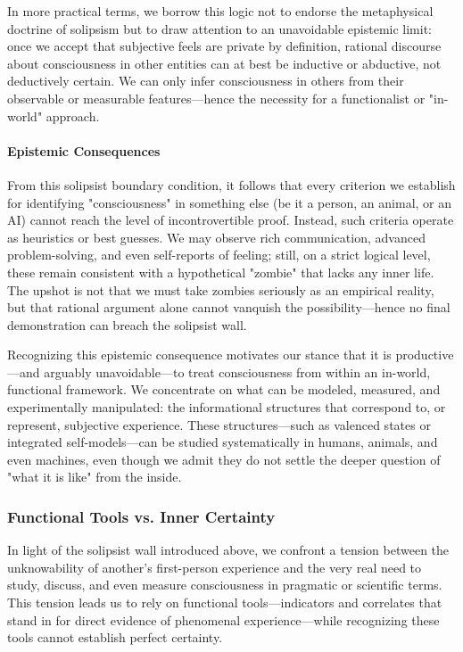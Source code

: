 \documentclass[12pt,letterpaper]{article}
\begin{document}
In more practical terms, we borrow this logic not to endorse the metaphysical doctrine of solipsism but to draw attention to an unavoidable epistemic limit: once we accept that subjective feels are private by definition, rational discourse about consciousness in other entities can at best be inductive or abductive, not deductively certain. We can only infer consciousness in others from their observable or measurable features---hence the necessity for a functionalist or "in-world" approach.

\paragraph{Epistemic Consequences}

From this solipsist boundary condition, it follows that every criterion we establish for identifying "consciousness" in something else (be it a person, an animal, or an AI) cannot reach the level of incontrovertible proof. Instead, such criteria operate as heuristics or best guesses. We may observe rich communication, advanced problem-solving, and even self-reports of feeling; still, on a strict logical level, these remain consistent with a hypothetical "zombie" that lacks any inner life. The upshot is not that we must take zombies seriously as an empirical reality, but that rational argument alone cannot vanquish the possibility---hence no final demonstration can breach the solipsist wall.

Recognizing this epistemic consequence motivates our stance that it is productive---and arguably unavoidable---to treat consciousness from within an in-world, functional framework. We concentrate on what can be modeled, measured, and experimentally manipulated: the informational structures that correspond to, or represent, subjective experience. These structures---such as valenced states or integrated self-models---can be studied systematically in humans, animals, and even machines, even though we admit they do not settle the deeper question of "what it is like" from the inside.

\subsubsection{Functional Tools vs. Inner Certainty}

In light of the solipsist wall introduced above, we confront a tension between the unknowability of another's first-person experience and the very real need to study, discuss, and even measure consciousness in pragmatic or scientific terms. This tension leads us to rely on functional tools---indicators and correlates that stand in for direct evidence of phenomenal experience---while recognizing these tools cannot establish perfect certainty.
\end{document}
